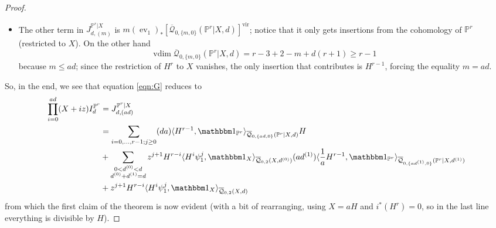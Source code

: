 \documentclass[11pt]{amsart}
\newcommand{\Q}[4]{\overline{\mathcal Q}_{#1,#2}(#3,#4)}
\newcommand{\PP}{\mathbb P}
\newcommand{\ev}{\operatorname{ev}}
\newcommand{\vdim}{\operatorname{vdim}}
\theoremstyle{plain}
\theoremstyle{definition}
\begin{document}
\begin{proof}
\begin{itemize}
\item The other term in $J^{\PP^r|X}_{d,(m)}$ is $m(\ev_1)_*[\Q{0}{\{m,0\}}{\PP^r|X}{d}]^\text{vir}$; notice that it only gets insertions from the cohomology of $\PP^r$ (restricted to $X$). On the other hand
\[
 \vdim \Q{0}{\{m,0\}}{\PP^r|X}{d}=r-3+2-m+d(r+1)\geq r-1
\]
because $m\leq ad$; since the restriction of $H^r$ to $X$ vanishes, the only insertion that contributes is $H^{r-1}$, forcing the equality $m=ad$.
\end{itemize}
So, in the end, we see that equation \ref{eqn:G} reduces to
\begin{align*}
 \prod_{i=0}^{ad}(X+iz) I^{\PP^r}_d &=J^{\PP^r|X}_{d,(ad)} \\
 &= \sum_{i=0,\ldots,r-1;j\geq 0}(da)\langle H^{r-1},\mathbbm 1_{\PP^r}\rangle_{\Q{0}{\{ad,0\}}{\PP^r|X}{d}} H \\
 &+\sum_{\substack{0<d^{(0)}<d \\ d^{(0)}+d^{(1)}=d}}z^{j+1}H^{r-i}\langle H^i\psi_1^j,\mathbbm 1_{X}\rangle_{\Q{0}{2}{X}{d^{(0)}}}(ad^{(1)})\langle \frac{1}{a}H^{r-1},\mathbbm 1_{\PP^r}\rangle_{\Q{0}{\{ad^{(1)},0\}}{\PP^r|X}{d^{(1)}}}\\
 &+z^{j+1}H^{r-i}\langle H^i\psi_1^j,\mathbbm 1_{X}\rangle_{\Q{0}{2}{X}{d}}
\end{align*}
from which the first claim of the theorem is now evident (with a bit of rearranging, using $X=aH$ and $i^*(H^r)=0$, so in the last line everything is divisible by $H$).

\smallskip


\end{proof}
\end{document}
